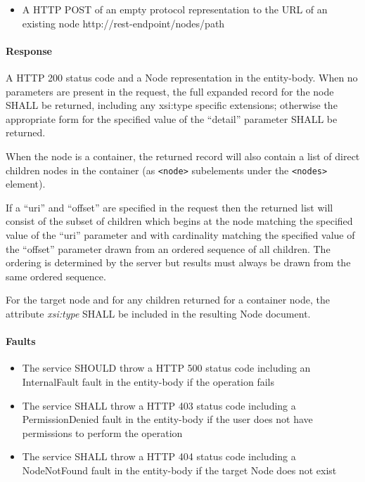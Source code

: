 \documentclass[11pt,a4paper]{ivoa}
\begin{document}
\begin{itemize}
    \item A HTTP POST of an empty protocol representation to the URL of an existing node http://rest-endpoint/nodes/path
\end{itemize}
    
\paragraph{Response}
A HTTP 200 status code and a Node representation in the entity-body.
When no parameters are present in the request, the full expanded record for the node SHALL be returned, including any xsi:type specific extensions; otherwise the appropriate form for the specified value of the ``detail'' parameter SHALL be returned.

When the node is a container, the returned record will also contain a list of direct children nodes in the container (as \verb|<node>| subelements under the \verb|<nodes>| element).

If a ``uri'' and ``offset'' are specified in the request then the returned list will consist of the subset of children which begins at the node matching the specified value of the ``uri'' parameter and with cardinality matching the specified value of the ``offset'' parameter drawn from an ordered sequence of all children. The ordering is determined by the server but results must always be drawn from the same ordered sequence.

For the target node and for any children returned for a container node, the attribute \emph{xsi:type} SHALL be included in the resulting Node document.  

\paragraph{Faults}
\begin{itemize}
    \item The service SHOULD throw a HTTP 500 status code including an InternalFault fault in the entity-body if the operation fails
    \item The service SHALL throw a HTTP 403 status code including a PermissionDenied fault in the entity-body if the user does not have permissions to perform the operation
    \item The service SHALL throw a HTTP 404 status code including a NodeNotFound fault in the entity-body if the target Node does not exist
\end{itemize}
\end{document}
